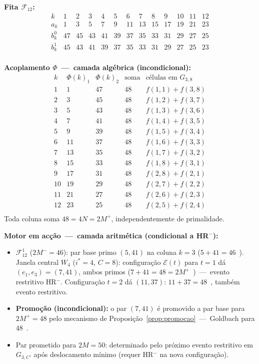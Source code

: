 \documentclass[12pt, a4paper]{article}
\theoremstyle{plain}
\theoremstyle{definition}
\theoremstyle{remark}
\begin{document}
	\medskip\noindent\textbf{Fita $\mathcal{F}_{12}$:}
	\[
	\begin{array}{c|cccccccccccc}
		k & 1&2&3&4&5&6&7&8&9&10&11&12\\
		\hline
		a_k   &1&3&5&7&9&11&13&15&17&19&21&23\\
		b_k^0 &47&45&43&41&39&37&35&33&31&29&27&25\\
		b_k^1 &45&43&41&39&37&35&33&31&29&27&25&23\\
	\end{array}
	\]
	
	\medskip\noindent\textbf{Acoplamento $\Phi$~---~camada algébrica
		(incondicional):}
	\[
	\begin{array}{c|cc|c|c}
		k & \Phi(k)_1 & \Phi(k)_2 & \text{soma} & \text{células em }G_{3,8}\\
		\hline
		1  & 1  & 47 & 48 & f(1,1)+f(3,8)\\
		2  & 3  & 45 & 48 & f(1,2)+f(3,7)\\
		3  & 5  & 43 & 48 & f(1,3)+f(3,6)\\
		4  & 7  & 41 & 48 & f(1,4)+f(3,5)\\
		5  & 9  & 39 & 48 & f(1,5)+f(3,4)\\
		6  & 11 & 37 & 48 & f(1,6)+f(3,3)\\
		7  & 13 & 35 & 48 & f(1,7)+f(3,2)\\
		8  & 15 & 33 & 48 & f(1,8)+f(3,1)\\
		9  & 17 & 31 & 48 & f(2,8)+f(2,1)\\
		10 & 19 & 29 & 48 & f(2,7)+f(2,2)\\
		11 & 21 & 27 & 48 & f(2,6)+f(2,3)\\
		12 & 23 & 25 & 48 & f(2,5)+f(2,4)\\
	\end{array}
	\]
	Toda coluna soma $48=4N=2M^+$, independentemente de primalidade. \checkmark
	
	\medskip\noindent\textbf{Motor em acção~---~camada aritmética
		(condicional a HR$^-$):}
	\begin{itemize}
		\item $\mathcal{F}_{12}^1$ ($2M^-=46$): par base primo $(5,41)$
		na coluna $k=3$ ($5+41=46$~\checkmark).
		Janela central $W_4$ ($i^*=4$, $C=8$):
		configuração $\mathcal{E}(t)$ para $t=1$ dá
		$(e_1,e_3)=(7,41)$, ambos primos
		($7+41=48=2M^+$~\checkmark)~---~evento restritivo HR$^-$.
		Configuração $t=2$ dá $(11,37)$: $11+37=48$~\checkmark,
		também evento restritivo.
		\item \textbf{Promoção (incondicional):} o par $(7,41)$ é
		promovido a par base para $2M^+=48$ pelo mecanismo de
		Proposição~\ref{prop:promocao}~---~Goldbach para
		$48$~\checkmark.
		\item Par prometido para $2M=50$: determinado pelo próximo
		evento restritivo em $G_{3,C'}$ após deslocamento mínimo
		(requer HR$^-$ na nova configuração).
	\end{itemize}
	
\end{document}
